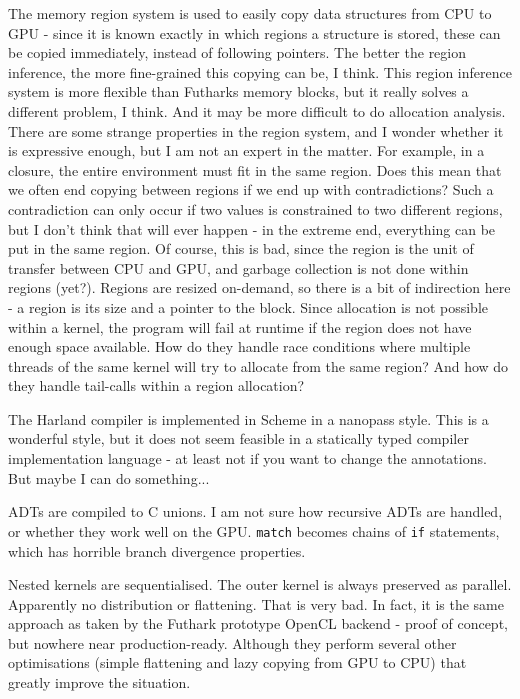 \documentclass[a4paper, oneside, final]{memoir}
\begin{document}
The memory region system is used to easily copy data structures from
CPU to GPU - since it is known exactly in which regions a structure is
stored, these can be copied immediately, instead of following
pointers.  The better the region inference, the more fine-grained this
copying can be, I think.  This region inference system is more
flexible than Futharks memory blocks, but it really solves a different
problem, I think.  And it may be more difficult to do allocation
analysis.  There are some strange properties in the region system, and
I wonder whether it is expressive enough, but I am not an expert in
the matter.  For example, in a closure, the entire environment must
fit in the same region.  Does this mean that we often end copying
between regions if we end up with contradictions?  Such a
contradiction can only occur if two values is constrained to two
different regions, but I don't think that will ever happen - in the
extreme end, everything can be put in the same region.  Of course,
this is bad, since the region is the unit of transfer between CPU and
GPU, and garbage collection is not done within regions (yet?).
Regions are resized on-demand, so there is a bit of indirection here -
a region is its size and a pointer to the block.  Since allocation is
not possible within a kernel, the program will fail at runtime if the
region does not have enough space available.  How do they handle race
conditions where multiple threads of the same kernel will try to
allocate from the same region?  And how do they handle tail-calls
within a region allocation?

The Harland compiler is implemented in Scheme in a nanopass style.
This is a wonderful style, but it does not seem feasible in a
statically typed compiler implementation language - at least not if
you want to change the annotations.  But maybe I can do something...

ADTs are compiled to C unions.  I am not sure how recursive ADTs are
handled, or whether they work well on the GPU.  \texttt{match} becomes
chains of \texttt{if} statements, which has horrible branch divergence
properties.

Nested kernels are sequentialised.  The outer kernel is always
preserved as parallel.  Apparently no distribution or flattening.
That is very bad.  In fact, it is the same approach as taken by the
Futhark prototype OpenCL backend - proof of concept, but nowhere near
production-ready.  Although they perform several other optimisations
(simple flattening and lazy copying from GPU to CPU) that greatly
improve the situation.
\end{document}
